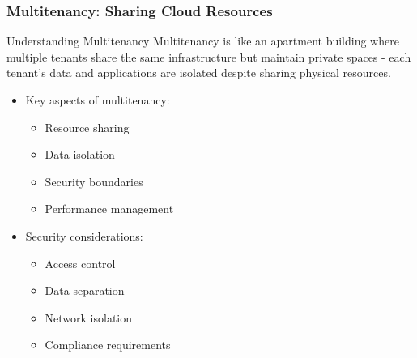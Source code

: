 \documentclass{beamer}
\begin{document}
\begin{frame}
    \frametitle{Multitenancy: Sharing Cloud Resources}
    
    \begin{block}{Understanding Multitenancy}
        Multitenancy is like an apartment building where multiple tenants share the same infrastructure but maintain private spaces - each tenant's data and applications are isolated despite sharing physical resources.
    \end{block}
    
    \begin{itemize}
        \item Key aspects of multitenancy:
        \begin{itemize}
            \item Resource sharing
            \item Data isolation
            \item Security boundaries
            \item Performance management
        \end{itemize}
        
        \item Security considerations:
        \begin{itemize}
            \item Access control
            \item Data separation
            \item Network isolation
            \item Compliance requirements
        \end{itemize}
    \end{itemize}
\end{frame}
\end{document}
